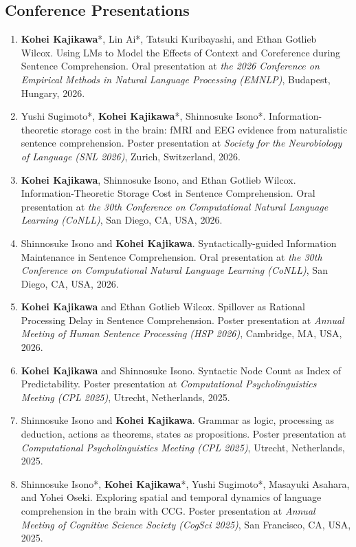 \documentclass[10pt,a4paper]{article}
\begin{document}
\subsection*{Conference Presentations}
\begin{enumerate}
    \item \textbf{Kohei Kajikawa}*, Lin Ai*, Tatsuki Kuribayashi, and Ethan Gotlieb Wilcox. Using LMs to Model the Effects of Context and Coreference during Sentence Comprehension. Oral presentation at \textit{the 2026 Conference on Empirical Methods in Natural Language Processing (EMNLP)}, Budapest, Hungary, 2026.
    \item Yushi Sugimoto*, \textbf{Kohei Kajikawa}*, Shinnosuke Isono*. Information-theoretic storage cost in the brain: fMRI and EEG evidence from naturalistic sentence comprehension. Poster presentation at \textit{Society for the Neurobiology of Language (SNL 2026)}, Zurich, Switzerland, 2026.
    \item \textbf{Kohei Kajikawa}, Shinnosuke Isono, and Ethan Gotlieb Wilcox. Information-Theoretic Storage Cost in Sentence Comprehension. Oral presentation at \textit{the 30th Conference on Computational Natural Language Learning (CoNLL)}, San Diego, CA, USA, 2026.
    \item Shinnosuke Isono and \textbf{Kohei Kajikawa}. Syntactically-guided Information Maintenance in Sentence Comprehension. Oral presentation at \textit{the 30th Conference on Computational Natural Language Learning (CoNLL)}, San Diego, CA, USA, 2026.
    \item \textbf{Kohei Kajikawa} and Ethan Gotlieb Wilcox. Spillover as Rational Processing Delay in Sentence Comprehension. Poster presentation at \textit{Annual Meeting of Human Sentence Processing (HSP 2026)}, Cambridge, MA, USA, 2026.
    \item \textbf{Kohei Kajikawa} and Shinnosuke Isono. Syntactic Node Count as Index of Predictability. Poster presentation at \textit{Computational Psycholinguistics Meeting (CPL 2025)}, Utrecht, Netherlands, 2025.
    \item Shinnosuke Isono and \textbf{Kohei Kajikawa}. Grammar as logic, processing as deduction, actions as theorems, states as propositions. Poster presentation at \textit{Computational Psycholinguistics Meeting (CPL 2025)}, Utrecht, Netherlands, 2025.
    \item Shinnosuke Isono*, \textbf{Kohei Kajikawa}*, Yushi Sugimoto*, Masayuki Asahara, and Yohei Oseki. Exploring spatial and temporal dynamics of language comprehension in the brain with CCG. Poster presentation at \textit{Annual Meeting of Cognitive Science Society (CogSci 2025)}, San Francisco, CA, USA, 2025.

\end{enumerate}
\end{document}
